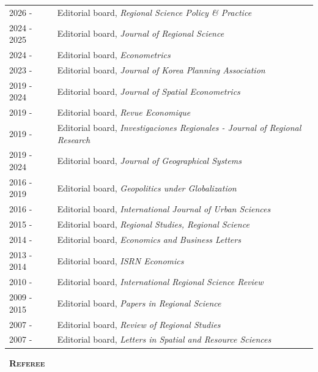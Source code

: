 \documentclass[a4paper,12pt]{article}
\newcommand{\smalltitre}[1]{%
	\noindent \textbullet~\textsc{\textbf{#1}}
	\smallskip
	}
\begin{document}
\noindent \begin{longtable}{@{}p{\annee}p{\texte}@{}}
2026 -  & Editorial board, \textit{Regional Science Policy \& Practice} \\
2024 - 2025 & Editorial board, \textit{Journal of Regional Science} \\
2024 - & Editorial board, \textit{Econometrics} \\
2023 - & Editorial board, \textit{Journal of Korea Planning Association} \\
2019 - 2024 & Editorial board, \textit{Journal of Spatial Econometrics} \\ 
2019 - & Editorial board, \textit{Revue Economique} \\ 
2019 - & Editorial board, \textit{Investigaciones Regionales - Journal of Regional Research} \\ 
2019 - 2024 & Editorial board, \textit{Journal of Geographical Systems} \\ 
2016 - 2019 & Editorial board, \textit{Geopolitics under Globalization} \\ 
2016 - & Editorial board, \textit{International Journal of Urban Sciences} \\ 
2015 - & Editorial board, \textit{Regional Studies, Regional Science} \\ 
2014 - & Editorial board, \textit{Economics and Business Letters}\\
2013 - 2014 & Editorial board, \textit{ISRN Economics}\\
2010 - & Editorial board, \textit{International Regional Science Review}\\
2009 - 2015 & Editorial board, \textit{Papers in Regional Science} \\
2007 - & Editorial board, \textit{Review of Regional Studies} \\
2007 - & Editorial board, \textit{Letters in Spatial and Resource Sciences}
\end{longtable}


\smalltitre{Referee} \\
\end{document}
